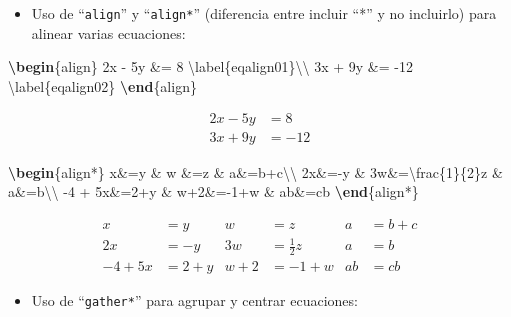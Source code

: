 \documentclass[12pt,a4paper,oneside,]{book}
\newenvironment{Shaded}{\begin{snugshade}}{\end{snugshade}}
\newcommand{\ExtensionTok}[1]{#1}
\newcommand{\KeywordTok}[1]{\textcolor[rgb]{0.13,0.29,0.53}{\textbf{#1}}}
\newcommand{\NormalTok}[1]{#1}
\newcommand{\SpecialCharTok}[1]{\textcolor[rgb]{0.00,0.00,0.00}{#1}}
\newcommand{\SpecialStringTok}[1]{\textcolor[rgb]{0.31,0.60,0.02}{#1}}
\providecommand{\tightlist}{%
  \setlength{\itemsep}{0pt}\setlength{\parskip}{0pt}}
\numberwithin{dummy}{section}
\theoremstyle{ocrenumbox}
\theoremstyle{blacknumex}
\theoremstyle{blacknumbox}
\theoremstyle{ocrenum}
\theoremstyle{ocrenum}
\begin{document}
\begin{itemize}
\tightlist
\item
  Uso de ``\texttt{align}'' y ``\texttt{align*}'' (diferencia entre
  incluir ``*'' y no incluirlo) para alinear varias ecuaciones:
\end{itemize}

\begin{Shaded}
\begin{Highlighting}[]
\KeywordTok{\textbackslash{}begin}\NormalTok{\{}\ExtensionTok{align}\NormalTok{\}}\SpecialStringTok{ }
\SpecialStringTok{2x {-} 5y \&=  8  }\SpecialCharTok{\textbackslash{}label}\SpecialStringTok{\{eqalign01\}}\SpecialCharTok{\textbackslash{}\textbackslash{}}\SpecialStringTok{ }
\SpecialStringTok{3x + 9y \&=  {-}12 }\SpecialCharTok{\textbackslash{}label}\SpecialStringTok{\{eqalign02\}}
\KeywordTok{\textbackslash{}end}\NormalTok{\{}\ExtensionTok{align}\NormalTok{\}}
\end{Highlighting}
\end{Shaded}

\begin{align} 
2x - 5y &=  8  \label{eqalign01}\\ 
3x + 9y &=  -12 \label{eqalign02}
\end{align}

\begin{Shaded}
\begin{Highlighting}[]
\KeywordTok{\textbackslash{}begin}\NormalTok{\{}\ExtensionTok{align*}\NormalTok{\}}
\SpecialStringTok{x\&=y           \&  w \&=z              \&  a\&=b+c}\SpecialCharTok{\textbackslash{}\textbackslash{}}
\SpecialStringTok{2x\&={-}y         \&  3w\&=}\SpecialCharTok{\textbackslash{}frac}\SpecialStringTok{\{1\}\{2\}z   \&  a\&=b}\SpecialCharTok{\textbackslash{}\textbackslash{}}
\SpecialStringTok{{-}4 + 5x\&=2+y   \&  w+2\&={-}1+w          \&  ab\&=cb}
\KeywordTok{\textbackslash{}end}\NormalTok{\{}\ExtensionTok{align*}\NormalTok{\}}
\end{Highlighting}
\end{Shaded}

\begin{align*}
x&=y           &  w &=z              &  a&=b+c\\
2x&=-y         &  3w&=\frac{1}{2}z   &  a&=b\\
-4 + 5x&=2+y   &  w+2&=-1+w          &  ab&=cb
\end{align*}

\begin{itemize}
\tightlist
\item
  Uso de ``\texttt{gather*}'' para agrupar y centrar ecuaciones:
\end{itemize}
\end{document}
